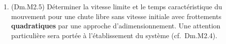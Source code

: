 \documentclass[a4paper, 12pt, final, garamond]{book}
\begin{document}
\begin{enumerate}
	\item{}(Dm.M2.5) Déterminer la vitesse limite et le temps caractéristique du
	      mouvement pour une chute libre sans vitesse initiale avec frottements
	      \textbf{quadratiques} par une approche d'adimensionnement. Une
	      attention particulière sera portée à l'établissement du système (cf.\
	      Dm.M2.4).
\end{enumerate}
\end{document}
